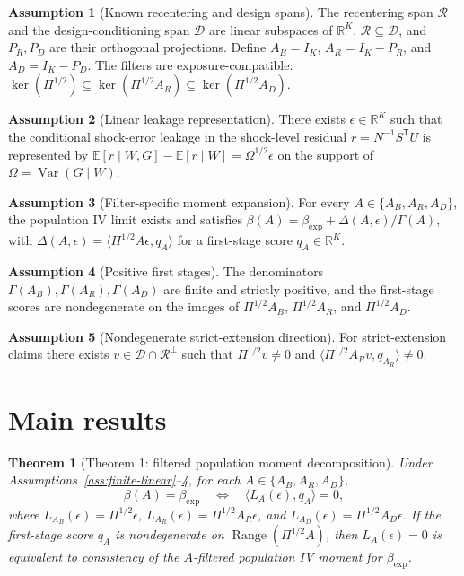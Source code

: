 \documentclass[11pt]{article}
\newcommand{\E}{\mathbb{E}}
\newcommand{\transpose}{\mathsf{T}}
\newcommand{\R}{\mathbb{R}}
\theoremstyle{definition}
\newtheorem{assumption}{Assumption}
\theoremstyle{plain}
\newtheorem{theorem}{Theorem}
\theoremstyle{remark}
\begin{document}
\begin{assumption}[Known recentering and design spans]\label{ass:spans}
The recentering span \(\mathcal R\) and the design-conditioning span \(\mathcal D\) are linear subspaces of \(\R^K\), \(\mathcal R\subseteq\mathcal D\), and \(P_R,P_D\) are their orthogonal projections.  Define \(A_B=I_K\), \(A_R=I_K-P_R\), and \(A_D=I_K-P_D\).  The filters are exposure-compatible: \(\ker(\Pi^{1/2})\subseteq\ker(\Pi^{1/2}A_R)\subseteq\ker(\Pi^{1/2}A_D)\).
\end{assumption}

\begin{assumption}[Linear leakage representation]\label{ass:leakage}
There exists \(\epsilon\in\R^K\) such that the conditional shock-error leakage in the shock-level residual \(r=N^{-1}S^\transpose U\) is represented by \(\E[r\mid W,G]-\E[r\mid W]=\Omega^{1/2}\epsilon\) on the support of \(\Omega=\operatorname{Var}(G\mid W)\).
\end{assumption}

\begin{assumption}[Filter-specific moment expansion]\label{ass:moment-expansion}
For every \(A\in\{A_B,A_R,A_D\}\), the population IV limit exists and satisfies \(\beta(A)=\beta_{\exp}+\Delta(A,\epsilon)/\Gamma(A)\), with \(\Delta(A,\epsilon)=\langle \Pi^{1/2}A\epsilon,q_A\rangle\) for a first-stage score \(q_A\in\R^K\).
\end{assumption}

\begin{assumption}[Positive first stages]\label{ass:first-stage}
The denominators \(\Gamma(A_B),\Gamma(A_R),\Gamma(A_D)\) are finite and strictly positive, and the first-stage scores are nondegenerate on the images of \(\Pi^{1/2}A_B\), \(\Pi^{1/2}A_R\), and \(\Pi^{1/2}A_D\).
\end{assumption}

\begin{assumption}[Nondegenerate strict-extension direction]\label{ass:strict-direction}
For strict-extension claims there exists \(v\in\mathcal D\cap\mathcal R^\perp\) such that \(\Pi^{1/2}v\ne0\) and \(\langle \Pi^{1/2}A_Rv,q_{A_R}\rangle\ne0\).
\end{assumption}

\section{Main results}
\begin{theorem}[Theorem 1: filtered population moment decomposition]\label{thm:filtered-decomposition}
Under Assumptions~\ref{ass:finite-linear}--\ref{ass:first-stage}, for each \(A\in\{A_B,A_R,A_D\}\),
\[
  \beta(A)=\beta_{\exp}
  \quad\Longleftrightarrow\quad
  \langle L_A(\epsilon),q_A\rangle=0,
\]
where \(L_{A_B}(\epsilon)=\Pi^{1/2}\epsilon\), \(L_{A_R}(\epsilon)=\Pi^{1/2}A_R\epsilon\), and \(L_{A_D}(\epsilon)=\Pi^{1/2}A_D\epsilon\).  If the first-stage score \(q_A\) is nondegenerate on \(\operatorname{Range}(\Pi^{1/2}A)\), then \(L_A(\epsilon)=0\) is equivalent to consistency of the \(A\)-filtered population IV moment for \(\beta_{\exp}\).
\end{theorem}
\end{document}

